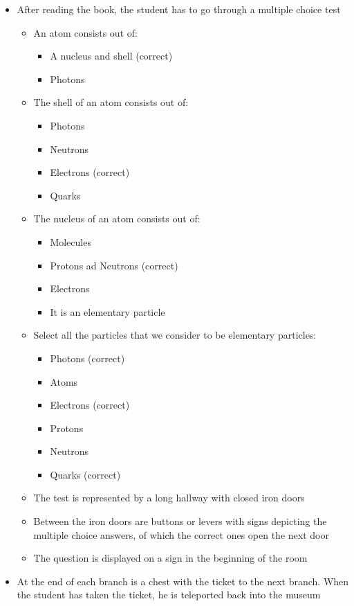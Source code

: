 \documentclass[11pt,twoside]{report} %
\begin{document}
\begin{itemize}
\begin{itemize}
	\end{itemize}
	\item After reading the book, the student has to go through a multiple choice test
	\begin{itemize}
		\item An atom consists out of:
		\begin{itemize}
			\item A nucleus and shell (correct)
			\item Photons
		\end{itemize}
		\item The shell of an atom consists out of:
		\begin{itemize}
			\item Photons
			\item Neutrons
			\item Electrons (correct)
			\item Quarks
		\end{itemize}
		\item The nucleus of an atom consists out of:
		\begin{itemize}
			\item Molecules
			\item Protons ad Neutrons (correct)
			\item Electrons
			\item It is an elementary particle
		\end{itemize}
		\item Select all the particles that we consider to be elementary particles:
		\begin{itemize}
			\item Photons (correct)
			\item Atoms
			\item Electrons (correct)
			\item Protons
			\item Neutrons
			\item Quarks (correct)
		\end{itemize}
		\item The test is represented by a long hallway with closed iron doors
		\item Between the iron doors are buttons or levers with signs depicting the multiple choice answers, of which the correct ones open the next door
		\item The question is displayed on a sign in the beginning of the room
	\end{itemize}
	\item At the end of each branch is a chest with the ticket to the next branch. When the student has taken the ticket, he is teleported back into the museum
\end{itemize}
\end{document}
